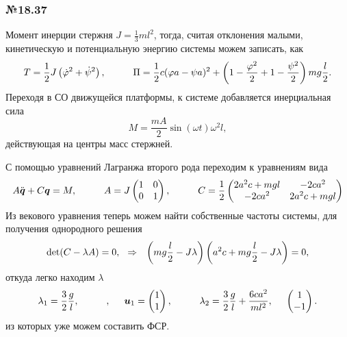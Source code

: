 \subsubsection*{№18.37}

Момент инерции стержня $J = \frac{1}{3} m l^2$, тогда, считая отклонения малыми, кинетическую и потенциальную энергию системы можем записать, как
\begin{equation*}
    T = \frac{1}{2} J \left(\dot{\varphi}^2 + \dot{\psi}^2\right),
    \hspace{1 cm}
    \Pi = \frac{1}{2}c (\varphi a - \psi a)^2 + \left(
        1 - \frac{\varphi^2}{2} + 1 - \frac{\psi^2}{2}
    \right) mg \frac{l}{2}.
\end{equation*}
Переходя в СО движущейся платформы, к системе добавляется инерциальная сила
\begin{equation*}
    M = \frac{mA}{2} \sin(\omega t) \omega^2 l,
\end{equation*}
действующая на центры масс стержней.

С помощью уравнений Лагранжа второго рода переходим к уравнениям вида
\begin{equation*}
    A \ddot{\mbox{\boldmath $q$}} + C \mbox{\boldmath $q$} = M,
    \hspace{1 cm}
    A = J \begin{pmatrix}
        1 & 0 \\
        0 & 1 \\
    \end{pmatrix},
    \hspace{1 cm}
    C = \frac{1}{2}\begin{pmatrix}
        2a^2c + mgl & -2ca^2 \\
        -2ca^2 & 2a^2 c + mgl \\
    \end{pmatrix}
\end{equation*}
Из векового уравнения теперь можем найти собственные частоты системы, для получения однородного решения
\begin{equation*}
    \det(C - \lambda A) = 0,
    \hspace{0.25cm} \Rightarrow \hspace{0.25cm}
    \left(
        mg \frac{l}{2} - J \lambda
    \right) \left(
        a^2 c + mg \frac{l}{2} - J \lambda
    \right) = 0,
\end{equation*}
откуда легко находим $\lambda$
\begin{equation*}
    \lambda_1 = \frac{3}{2}\frac{g}{l}, \hspace{1 cm},
    \hspace{0.5 cm} \mbox{\boldmath $u$}_1 = \begin{pmatrix}
        1 \\ 1
    \end{pmatrix},
    \hspace{1 cm}
    \lambda_2 = \frac{3}{2} \frac{g}{l} + \frac{6ca^2}{ml^2},
    \hspace{0.5 cm} 
    \begin{pmatrix}
        1 \\ -1
    \end{pmatrix}.
\end{equation*}
из которых уже можем составить ФСР.

